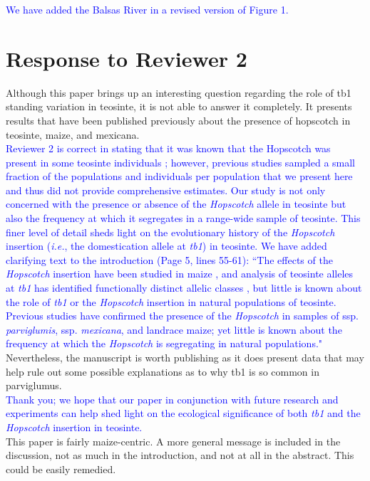 \documentclass[11pt]{article}
\newcommand{\res}[1]{\noindent \textcolor{blue}{{#1}} \\}
\begin{document}
\res{We have added the Balsas River in a revised version of Figure 1.}


\section*{Response to Reviewer 2} 
Although this paper brings up an interesting question regarding the role of tb1 standing variation in teosinte, it is not able to answer it completely.  It presents results that have been published previously about the presence of hopscotch in teosinte, maize, and mexicana.\\ 

\res{Reviewer 2 is correct in stating that it was known that the Hopscotch was present in some teosinte individuals \citep{Studer2011}; however, previous studies sampled a small fraction of the populations and individuals per population that we present here and thus did not provide comprehensive estimates. 
Our study is not only concerned with the presence or absence of the \emph{Hopscotch} allele in teosinte but also the frequency at which it segregates in a range-wide sample of teosinte.  
This finer level of detail sheds light on the evolutionary history of the \emph{Hopscotch} insertion (\emph{i.e.}, the domestication allele at \emph{tb1}) in teosinte. 
We have added clarifying text to the introduction (Page 5, lines 55-61): ``The effects of the \emph{Hopscotch} insertion have been studied in maize \citep{Studer2011}, and analysis of teosinte alleles at \emph{tb1} has identified functionally distinct allelic classes \citep{StuderDoebley2012}, but little is known about the role of \emph{tb1} or the \emph{Hopscotch} insertion in natural populations of teosinte. Previous studies have confirmed the presence of the \emph{Hopscotch} in samples of ssp. \emph{parviglumis}, ssp. \emph{mexicana}, and landrace maize; yet little is known about the frequency at which the \emph{Hopscotch} is segregating in natural populations."}

Nevertheless, the manuscript is worth publishing as it does present data that may help rule out some possible explanations as to why tb1 is so common in parviglumus.\\

\res{Thank you; we hope that our paper in conjunction with future research and experiments can help shed light on the ecological significance of both \emph{tb1} and the \emph{Hopscotch} insertion in teosinte.}

This paper is fairly maize-centric. A more general message is included in the discussion, not as much in the introduction, and not at all in the abstract. This could be easily remedied.\\
\end{document}
